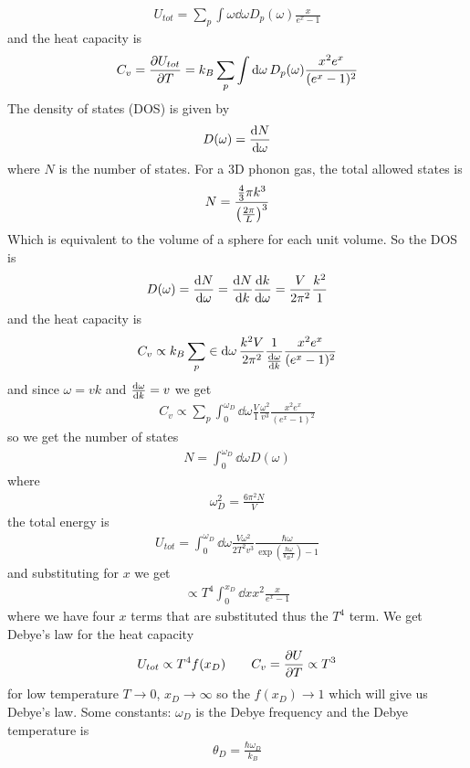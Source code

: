 \documentclass[../main.tex]{subfiles}
\begin{document}
\begin{align*}
    U_{tot} = \sum_p \int \omega \dd{\omega} D_p(\omega) \frac{x}{e^x - 1}
\end{align*}
and the heat capacity is
\begin{align*}
    C_v = \pdv{U_{tot}}{T}
    = k_B \sum_p \int \dd{\omega} D_p(\omega) \frac{x^2 e^x}{(e^x - 1)^2}
\end{align*}
The density of states (DOS) is given by
\begin{align*}
    D(\omega) = \dv{N}{\omega}
\end{align*}
where $N$ is the number of states. For a 3D phonon gas, the total allowed states is
\begin{align*}
    N = \frac{\frac{4}{3} \pi k^3}{\qt(\frac{2\pi}{L})^3}
\end{align*}
Which is equivalent to the volume of a sphere for each unit volume. So the DOS is 
\begin{align*}
    D(\omega) = \dv{N}{\omega} = \dv{N}{k} \dv{k}{\omega} = \frac{V}{2\pi^2} \frac{k^2}{1}
\end{align*}
and the heat capacity is
\begin{align*}
    C_v \propto k_B \sum_p \in \dd{\omega} \frac{k^2V}{2\pi^2} \frac{1}{\dv{\omega}{k}} \frac{x^2 e^x}{(e^x - 1)^2}
\end{align*}
and since $\omega = v k$ and $\dv{\omega}{k} = v$ we get
\begin{align*}
    C_v \propto \sum_p \int_0^{\omega_D} \dd{\omega} \frac{V}{1} \frac{\omega^2}{v^3} \frac{x^2 e^x}{(e^x - 1)^2}
\end{align*}
so we get the number of states
\begin{align*}
    N = \int_0^{\omega_D} \dd{\omega} D(\omega)
\end{align*}
where
\begin{align*}
    \omega_D^2 = \frac{6\pi^2 N}{V}
\end{align*}
the total energy is
\begin{align*}
    U_{tot} = \int_0^{\omega_D} \dd{\omega} \frac{V\omega^2}{2 T^2 v^3} \frac{\hbar \omega}{\exp(\frac{\hbar \omega}{k_B T}) - 1}
\end{align*}
and substituting for $x$ we get
\begin{align*}
    \propto T^4 \int_0^{x_D} \dd{x} x^2 \frac{x}{e^x - 1}
\end{align*}
where we have four $x$ terms that are substituted thus the $T^4$ term. We get Debye's law for the
heat capacity
\begin{align*}
    U_{tot} \propto T^4 f(x_D) \qquad C_v = \pdv{U}{T} \propto T^3
\end{align*}
for low temperature $T \to 0$, $x_D \to \infty$ so the $f(x_D) \to 1$ which will give us Debye's
law. Some constants: $\omega_D$ is the Debye frequency and the Debye temperature is
\begin{align*}
    \theta_D = \frac{\hbar \omega_D}{k_B}
\end{align*}
\end{document}
